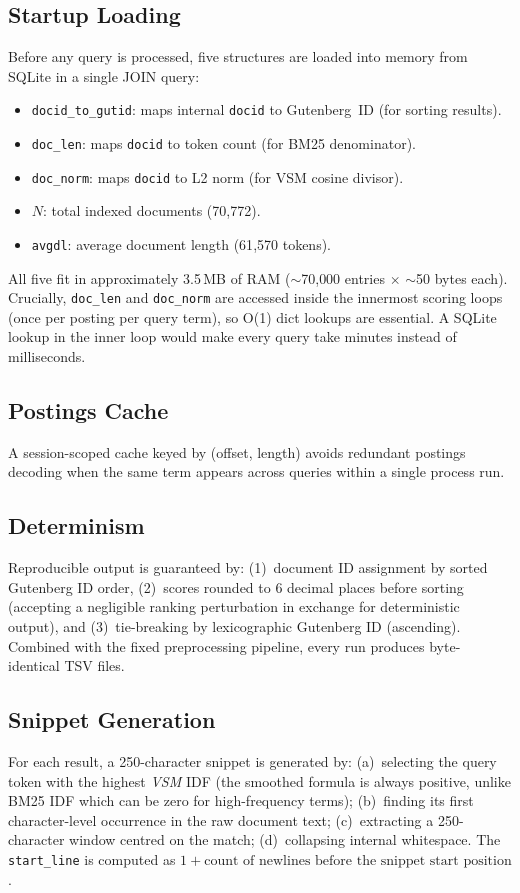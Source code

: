 \documentclass[sigconf,nonacm]{acmart}
\begin{document}
\subsection{Startup Loading}
Before any query is processed, five structures are loaded into memory from
SQLite in a single JOIN query:
\begin{itemize}[nosep]
  \item \texttt{docid\_to\_gutid}: maps internal \texttt{docid} to Gutenberg~ID
        (for sorting results).
  \item \texttt{doc\_len}: maps \texttt{docid} to token count (for BM25 denominator).
  \item \texttt{doc\_norm}: maps \texttt{docid} to L2 norm (for VSM cosine divisor).
  \item $N$: total indexed documents (70{,}772).
  \item \texttt{avgdl}: average document length (61{,}570 tokens).
\end{itemize}
All five fit in approximately 3.5\,MB of RAM ($\sim$70{,}000 entries $\times$
$\sim$50 bytes each).  Crucially, \texttt{doc\_len} and \texttt{doc\_norm} are
accessed inside the innermost scoring loops (once per posting per query term),
so O(1) dict lookups are essential.  A SQLite lookup in the inner loop would
make every query take minutes instead of milliseconds.

\subsection{Postings Cache}
A session-scoped cache keyed by (offset, length) avoids redundant postings
decoding when the same term appears across queries within a single process run.

\subsection{Determinism}
Reproducible output is guaranteed by: (1)~document ID assignment by sorted
Gutenberg ID order, (2)~scores rounded to 6 decimal places before sorting
(accepting a negligible ranking perturbation in exchange for deterministic
output), and (3)~tie-breaking by lexicographic Gutenberg ID (ascending).
Combined with the fixed preprocessing pipeline, every run produces
byte-identical TSV files.

\subsection{Snippet Generation}
For each result, a 250-character snippet is generated by: (a)~selecting the
query token with the highest \emph{VSM} IDF (the smoothed formula is always
positive, unlike BM25 IDF which can be zero for high-frequency terms);
(b)~finding its first character-level occurrence in the raw document text;
(c)~extracting a 250-character window centred on the match; (d)~collapsing
internal whitespace.  The \texttt{start\_line} is computed as
$1 + \text{count of newlines before the snippet start position}$.
\end{document}
